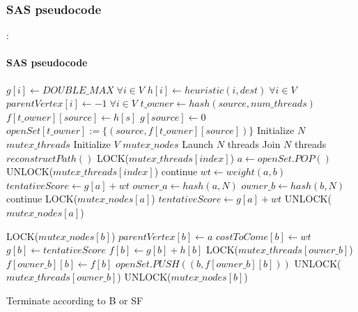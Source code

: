\documentclass[12pt]{beamer}
\begin{document}
	\subsubsection{SAS pseudocode}
	\begin{frame}[allowframebreaks]{\secname : \subsecname}
		\framesubtitle{SAS pseudocode}
		\begin{algorithmic}[1]
				\State $g[i] \gets DOUBLE\_MAX \;\forall i \in V$\;
				\State $h[i] \gets heuristic(i, dest) \; \forall i \in V$\;
				\State $parentVertex[i] \gets -1 \; \forall i \in V$\;
				\State $t\_owner \gets hash(source, num\_threads)$\;
				\State $f[t\_owner][source] \gets h[s]$\;
				\State $g[source] \gets 0$\;
				\State $openSet[t\_owner] := \{(source, f[t\_owner][source])\}$\;
				\State Initialize $N$ $mutex\_threads$\;
				\State Initialize $V$ $mutex\_nodes$\;
				\State Launch $N$ threads\;
				\State Join $N$ threads\;
				\State $reconstructPath()$\;
			\EndFunction
        				\State LOCK($mutex\_threads[index]$)\;
        				\State $a \gets openSet.POP()$\;
        				\State UNLOCK($mutex\_threads[index]$)\;
      				\EndWhile
        			\State continue\;
      			\EndIf
        			\State $wt \gets weight(a, b)$\;
        			\State $tentativeScore \gets g[a] + wt$\;
          				\State $owner\_a \gets hash(a,N)$\;
          				\State $owner\_b \gets hash(b,N)$\;
					\EndIf
            			\State continue\;
          			\EndIf
          			\State LOCK($mutex\_nodes[a]$)\;
          			\State $tentativeScore \gets g[a] + wt$\;
          			\State UNLOCK($mutex\_nodes[a]$)\;

          			\State LOCK($mutex\_nodes[b]$)\;
					    \State $parentVertex[b] \gets a$\;
            			\State $costToCome[b] \gets wt$\;
            			\State $g[b] \gets tentativeScore$\;
            			\State $f[b] \gets g[b] + h[b]$\;
            			\State LOCK($mutex\_threads[owner\_b]$)\;
            			\State $f[owner\_b][b] \gets f[b]$\;
            			\State $openSet.PUSH((b, f[owner\_b][b]))$\;
            			\State UNLOCK($mutex\_threads[owner\_b]$)\;
          			\EndIf
          			\State UNLOCK($mutex\_nodes[b]$)\;
        		\EndFor
				\EndWhile

        		\State Terminate according to B or SF\;
      		\EndIf
		  \EndFunction
		  \end{algorithmic}
	\end{frame}
\end{document}
